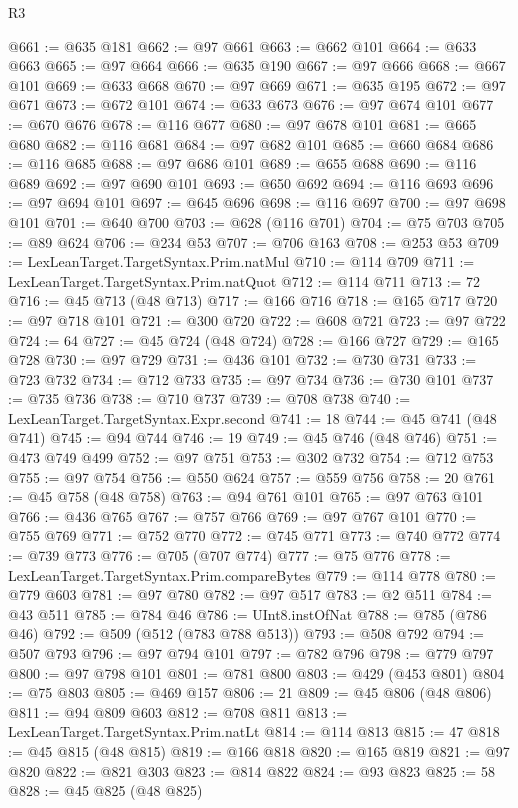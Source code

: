 \begin{lexlean}{R3}
\begin{coremodule}
@661 := @635 @181
@662 := @97 @661
@663 := @662 @101
@664 := @633 @663
@665 := @97 @664
@666 := @635 @190
@667 := @97 @666
@668 := @667 @101
@669 := @633 @668
@670 := @97 @669
@671 := @635 @195
@672 := @97 @671
@673 := @672 @101
@674 := @633 @673
@676 := @97 @674 @101
@677 := @670 @676
@678 := @116 @677
@680 := @97 @678 @101
@681 := @665 @680
@682 := @116 @681
@684 := @97 @682 @101
@685 := @660 @684
@686 := @116 @685
@688 := @97 @686 @101
@689 := @655 @688
@690 := @116 @689
@692 := @97 @690 @101
@693 := @650 @692
@694 := @116 @693
@696 := @97 @694 @101
@697 := @645 @696
@698 := @116 @697
@700 := @97 @698 @101
@701 := @640 @700
@703 := @628 (@116 @701)
@704 := @75 @703
@705 := @89 @624
@706 := @234 @53
@707 := @706 @163
@708 := @253 @53
@709 := LexLeanTarget.TargetSyntax.Prim.natMul
@710 := @114 @709
@711 := LexLeanTarget.TargetSyntax.Prim.natQuot
@712 := @114 @711
@713 := 72
@716 := @45 @713 (@48 @713)
@717 := @166 @716
@718 := @165 @717
@720 := @97 @718 @101
@721 := @300 @720
@722 := @608 @721
@723 := @97 @722
@724 := 64
@727 := @45 @724 (@48 @724)
@728 := @166 @727
@729 := @165 @728
@730 := @97 @729
@731 := @436 @101
@732 := @730 @731
@733 := @723 @732
@734 := @712 @733
@735 := @97 @734
@736 := @730 @101
@737 := @735 @736
@738 := @710 @737
@739 := @708 @738
@740 := LexLeanTarget.TargetSyntax.Expr.second
@741 := 18
@744 := @45 @741 (@48 @741)
@745 := @94 @744
@746 := 19
@749 := @45 @746 (@48 @746)
@751 := @473 @749 @499
@752 := @97 @751
@753 := @302 @732
@754 := @712 @753
@755 := @97 @754
@756 := @550 @624
@757 := @559 @756
@758 := 20
@761 := @45 @758 (@48 @758)
@763 := @94 @761 @101
@765 := @97 @763 @101
@766 := @436 @765
@767 := @757 @766
@769 := @97 @767 @101
@770 := @755 @769
@771 := @752 @770
@772 := @745 @771
@773 := @740 @772
@774 := @739 @773
@776 := @705 (@707 @774)
@777 := @75 @776
@778 := LexLeanTarget.TargetSyntax.Prim.compareBytes
@779 := @114 @778
@780 := @779 @603
@781 := @97 @780
@782 := @97 @517
@783 := @2 @511
@784 := @43 @511
@785 := @784 @46
@786 := UInt8.instOfNat
@788 := @785 (@786 @46)
@792 := @509 (@512 (@783 @788 @513))
@793 := @508 @792
@794 := @507 @793
@796 := @97 @794 @101
@797 := @782 @796
@798 := @779 @797
@800 := @97 @798 @101
@801 := @781 @800
@803 := @429 (@453 @801)
@804 := @75 @803
@805 := @469 @157
@806 := 21
@809 := @45 @806 (@48 @806)
@811 := @94 @809 @603
@812 := @708 @811
@813 := LexLeanTarget.TargetSyntax.Prim.natLt
@814 := @114 @813
@815 := 47
@818 := @45 @815 (@48 @815)
@819 := @166 @818
@820 := @165 @819
@821 := @97 @820
@822 := @821 @303
@823 := @814 @822
@824 := @93 @823
@825 := 58
@828 := @45 @825 (@48 @825)

\end{coremodule}
\end{lexlean}
